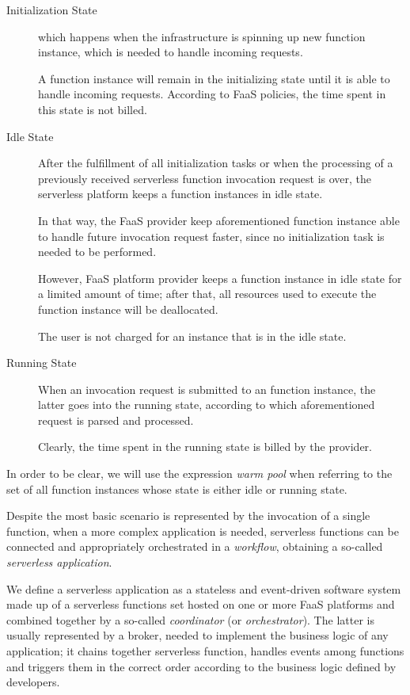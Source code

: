 \documentclass[12pt,a4paper]{report}
\begin{document}
\begin{description}
	
	\item[Initialization State] which happens when the infrastructure is spinning up new function instance, which is needed to handle incoming requests. 
	
	A function instance will remain in the initializing state until it is able to handle incoming requests. According to FaaS policies, the time spent in this state is not billed. 
	
	\item[Idle State] After the fulfillment of all initialization tasks or when the processing of a previously received serverless function invocation request is over, the serverless platform keeps a function instances in idle state.
	
	In that way, the FaaS provider keep aforementioned function instance able to handle future invocation request faster, since no initialization task is needed to be performed.
	
	However, FaaS platform provider keeps a function instance in idle state for a limited amount of time; after that, all resources used to execute the function instance will be deallocated.
	
	The user is not charged for an instance that is in the idle state.
	
	\item[Running State] When an invocation request is submitted to an function instance, the latter goes into the running state, according to which aforementioned request is parsed and processed.
	
	Clearly, the time spent in the running state is billed by the provider.
	
\end{description}

In order to be clear, we will use the expression \textit{warm pool} when referring to the set of all function instances whose state is either idle or running state.

Despite the most basic scenario is represented by the invocation of a single function, when a more complex application is needed, serverless functions can be connected and appropriately orchestrated in a \textit{workflow}, obtaining a so-called \textit{serverless application}.

We define a serverless application as a stateless and event-driven software system made up of a serverless functions set hosted on one or more FaaS platforms and combined together by a so-called \textit{coordinator} (or \textit{orchestrator}). The latter is usually represented by a broker, needed to implement the business logic of any application; it chains together serverless function, handles events among functions and triggers them in the correct order according to the business logic defined by developers. 
\end{document}
